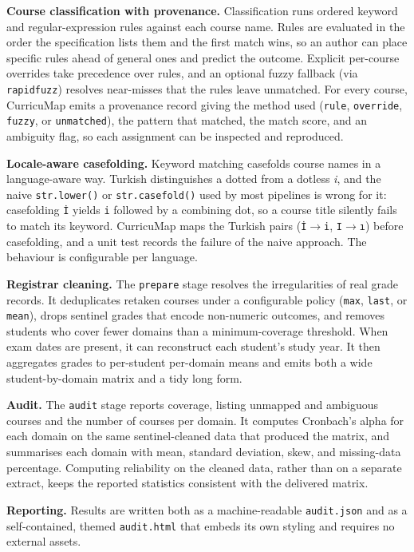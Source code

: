 \documentclass[11pt]{article}
\begin{document}
\textbf{Course classification with provenance.} Classification runs ordered keyword and regular-expression rules against each course name. Rules are evaluated in the order the specification lists them and the first match wins, so an author can place specific rules ahead of general ones and predict the outcome. Explicit per-course overrides take precedence over rules, and an optional fuzzy fallback (via \texttt{rapidfuzz}) resolves near-misses that the rules leave unmatched. For every course, CurricuMap emits a provenance record giving the method used (\texttt{rule}, \texttt{override}, \texttt{fuzzy}, or \texttt{unmatched}), the pattern that matched, the match score, and an ambiguity flag, so each assignment can be inspected and reproduced.

\textbf{Locale-aware casefolding.} Keyword matching casefolds course names in a language-aware way. Turkish distinguishes a dotted from a dotless \emph{i}, and the naive \texttt{str.lower()} or \texttt{str.casefold()} used by most pipelines is wrong for it: casefolding \texttt{\.I} yields \texttt{i} followed by a combining dot, so a course title silently fails to match its keyword. CurricuMap maps the Turkish pairs (\texttt{\.I}$\rightarrow$\texttt{i}, \texttt{I}$\rightarrow$\texttt{\i}) before casefolding, and a unit test records the failure of the naive approach. The behaviour is configurable per language.

\textbf{Registrar cleaning.} The \texttt{prepare} stage resolves the irregularities of real grade records. It deduplicates retaken courses under a configurable policy (\texttt{max}, \texttt{last}, or \texttt{mean}), drops sentinel grades that encode non-numeric outcomes, and removes students who cover fewer domains than a minimum-coverage threshold. When exam dates are present, it can reconstruct each student's study year. It then aggregates grades to per-student per-domain means and emits both a wide student-by-domain matrix and a tidy long form.

\textbf{Audit.} The \texttt{audit} stage reports coverage, listing unmapped and ambiguous courses and the number of courses per domain. It computes Cronbach's alpha \cite{cronbach1951} for each domain on the same sentinel-cleaned data that produced the matrix, and summarises each domain with mean, standard deviation, skew, and missing-data percentage. Computing reliability on the cleaned data, rather than on a separate extract, keeps the reported statistics consistent with the delivered matrix.

\textbf{Reporting.} Results are written both as a machine-readable \texttt{audit.json} and as a self-contained, themed \texttt{audit.html} that embeds its own styling and requires no external assets.
\end{document}
